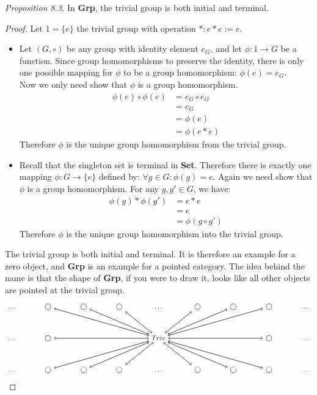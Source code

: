 \textit{Proposition 8.3.} In \textbf{Grp}, the trivial group is both initial and terminal.\begin{proof}
Let $1=\{e\}$ the trivial group with operation $*: e*e := e$.
\begin {itemize}
\item Let $\left({G, \circ}\right)$ be any group with identity element $e_G$,
  and let $\phi: 1 \to G$ be a function.
  Since group homomorphisms to preserve the identity,
  there is only one possible mapping for $\phi$ to be a group homomorphism:
  $\phi (e) = e_G$.\\
  Now we only need show that $\phi$ is a group homomorphism.
  \begin{align*}
    \phi (e) \circ \phi (e) &= e_G \circ e_G \\
                            &= e_G \\
                            &= \phi (e) \\
                            &= \phi (e * e)
  \end{align*}
  Therefore $\phi$ is the unique group homomorphism from the trivial group.
\item Recall that the singleton set is terminal in \textbf{Set}.
  Therefore there is exactly one mapping
  $\phi: G \to \{e\}$ defined by:
  $\forall g \in G: \phi(g) = e$.
  Again we need show that $\phi$ is a group homomorphism.
  For any $g, g' \in G$, we have:
  \begin{align*}
    \phi(g)*\phi(g') &= e * e \\
    &= e \\
    &= \phi (g \circ g')
  \end{align*}
  Therefore $\phi$ is the unique group homomorphism into the trivial group.
\end{itemize}
The trivial group is both initial and terminal. It is therefore an example for a
zero object, and \textbf{Grp} is an example for a pointed category.
The idea behind the name is that the shape of \textbf{Grp}, if you were to draw it,
looks like all other objects are pointed at the trivial group.
\[
  \begin{tikzcd}[column sep=large]
    \dots
    & \bigcirc \arrow [drrr, ""]
    & \bigcirc \arrow[drr, ""]
    & \bigcirc \arrow[dr, ""]
    & \dots
    & \bigcirc \arrow[dl, ""]
    & \bigcirc \arrow[dll,""]
    & \bigcirc \arrow[dlll,""]
    & \dots \\[5mm]
    \dots
    & \bigcirc \arrow[rrr, ""]
    & & &
    Triv
    \arrow[dlll, ""]
    \arrow[dll, ""]
    \arrow[dl, ""]
    \arrow[dr, ""]
    \arrow[drr, ""]
    \arrow[drrr, ""]
    \arrow[ulll, ""]
    \arrow[ull, ""]
    \arrow[ul, ""]
    \arrow[ur, ""]
    \arrow[urr, ""]
    \arrow[urrr, ""]
    \arrow[rrr, ""]
    \arrow[lll, ""]
    & &
    &  \bigcirc \arrow[lll, ""]
    & \dots   \\[5mm]
    \dots
    & \bigcirc \arrow [urrr, ""]
    & \bigcirc \arrow[urr, ""]
    & \bigcirc \arrow[ur, ""]
    & \dots
    & \bigcirc \arrow[ul, ""]
    & \bigcirc \arrow[ull,""]
    & \bigcirc \arrow[ulll,""]
    & \dots
  \end{tikzcd}
\]\end{proof}


